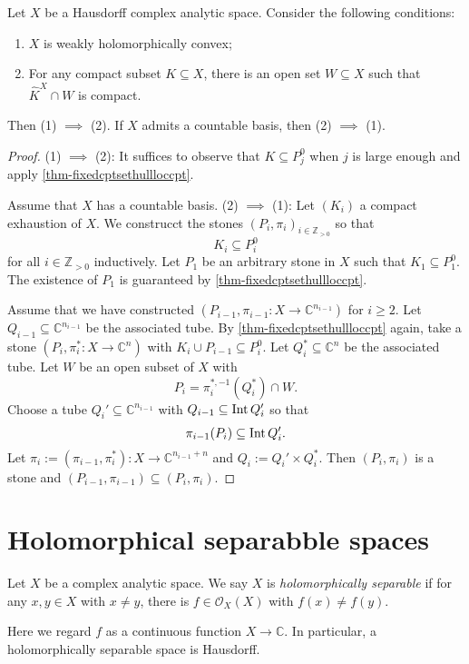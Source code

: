 \begin{thm}\label{thm-weaklyholconvchar}
    Let $X$ be a Hausdorff complex analytic space. Consider the following conditions:
    \begin{enumerate}
        \item $X$ is weakly holomorphically convex;
        \item For any compact subset $K\subseteq X$, there is an open set $W\subseteq X$ such that $\hat{K}^X\cap W$ is compact.
    \end{enumerate}
    Then (1) $\implies$ (2). If $X$ admits a countable basis, then (2) $\implies$ (1).
\end{thm}
\begin{proof}
    (1) $\implies$ (2): It suffices to observe that $K\subseteq P_j^0$ when $j$ is large enough and apply \cref{thm-fixedcptsethullloccpt}.

    Assume that $X$ has a countable basis.
    (2) $\implies$ (1): 
    Let $(K_i)$ a compact exhaustion of $X$. We construcct the stones $(P_i,\pi_i)_{i\in \mathbb{Z}_{>0}}$ so that 
    \[
        K_i\subseteq P_i^0
    \] 
    for all $i\in \mathbb{Z}_{>0}$
    inductively. Let $P_1$ be an arbitrary stone in $X$ such that $K_1\subseteq P_1^0$. The existence of $P_1$ is guaranteed by \cref{thm-fixedcptsethullloccpt}.

    Assume that we have constructed $(P_{i-1},\pi_{i-1}:X\rightarrow  \mathbb{C}^{n_{i-1}})$ for $i\geq 2$. Let $Q_{i-1}\subseteq \mathbb{C}^{n_{i-1}}$ be the associated tube. By   \cref{thm-fixedcptsethullloccpt} again, take a stone $(P_i,\pi_i^*:X\rightarrow \mathbb{C}^n)$ with $K_i\cup P_{i-1}\subseteq P_i^0$. Let $Q_i^*\subseteq \mathbb{C}^n$ be the associated tube. Let $W$ be an open subset of $X$ with 
    \[
        P_i=\pi_i^{*,-1}(Q_i^*)\cap W.  
    \]
    Choose a tube $Q_i'\subseteq \mathbb{C}^{n_{i-1}}$ with $Q_{i-1}\subseteq \operatorname{Int} Q_i'$ so that 
    \[
        \pi_{i-1}(P_i)\subseteq \operatorname{Int} Q_i'.
    \]
    Let $\pi_i:=(\pi_{i-1},\pi_i^*):X\rightarrow \mathbb{C}^{n_{i-1}+n}$ and $Q_i:=Q_i'\times Q_i^*$. Then $(P_i,\pi_i)$ is a stone and $(P_{i-1},\pi_{i-1})\subseteq (P_i,\pi_i)$.
\end{proof}


\section{Holomorphical separabble spaces}
\begin{definition}
    Let $X$ be a complex analytic space. We say $X$ is \emph{holomorphically separable} if for any $x,y\in X$ with $x\neq y$, there is $f\in \mathcal{O}_X(X)$ with $f(x)\neq f(y)$.
\end{definition}
Here we regard $f$ as a continuous function $X\rightarrow \mathbb{C}$. In particular, a holomorphically separable space is Hausdorff.


